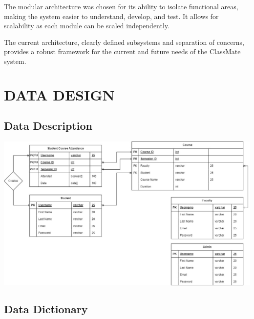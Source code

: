 \documentclass[letterpaper,12pt,oneside,listof=totoc]{scrreprt}
\begin{document}
The modular architecture was chosen for its ability to isolate functional areas, making the system easier to understand, develop, and test. It allows for scalability as each module can be scaled independently. 

The current architecture, clearly defined subsystems and separation of concerns, provides a robust framework for the current and future needs of the ClassMate system.


\chapter{DATA DESIGN}

\section{Data Description}

\includegraphics[scale=0.4]{Course_Model_2.jpg}
\pagebreak

\section{Data Dictionary}
\end{document}
